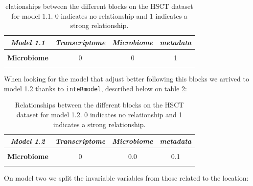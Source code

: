 \documentclass[
  12pt,
  a4paper,
  twoside,
  openright]{book}
\begin{document}
\begin{table}[H]

\caption[Model 1.1 of HSCT dataset.]{\label{tab:hsct-model1-1}elationships between the different blocks on the HSCT dataset for model 1.1. 0 indicates no relationship and 1 indicates a strong relationship.}
\centering
\begin{tabular}[t]{|>{}c|c|c|>{}c|}
\hline
\em{\textbf{Model 1.1}} & \em{\textbf{Transcriptome}} & \em{\textbf{Microbiome}} & \em{\textbf{metadata}}\\
\hline
\textbf{\cellcolor{gray!6}{Transcriptome}} & \cellcolor{gray!6}{0} & \cellcolor{gray!6}{0} & \cellcolor{gray!6}{1}\\
\hline
\textbf{Microbiome} & 0 & 0 & 1\\
\hline
\textbf{\cellcolor{gray!6}{metadata}} & \cellcolor{gray!6}{1} & \cellcolor{gray!6}{1} & \cellcolor{gray!6}{0}\\
\hline
\end{tabular}
\end{table}

When looking for the model that adjust better following this blocks we arrived to model 1.2 thanks to \texttt{inteRmodel}, described below on table \ref{tab:hsct-model1-2}:

\begin{table}[H]

\caption[Model 1.2 of HSCT dataset.]{\label{tab:hsct-model1-2}Relationships between the different blocks on the HSCT dataset for model 1.2. 0 indicates no relationship and 1 indicates a strong relationship.}
\centering
\begin{tabular}[t]{|>{}c|c|c|>{}c|}
\hline
\em{\textbf{Model 1.2}} & \em{\textbf{Transcriptome}} & \em{\textbf{Microbiome}} & \em{\textbf{metadata}}\\
\hline
\textbf{\cellcolor{gray!6}{Transcriptome}} & \cellcolor{gray!6}{0} & \cellcolor{gray!6}{0.0} & \cellcolor{gray!6}{1.0}\\
\hline
\textbf{Microbiome} & 0 & 0.0 & 0.1\\
\hline
\textbf{\cellcolor{gray!6}{metadata}} & \cellcolor{gray!6}{1} & \cellcolor{gray!6}{0.1} & \cellcolor{gray!6}{0.0}\\
\hline
\end{tabular}
\end{table}

On model two we split the invariable variables from those related to the location:
\end{document}

